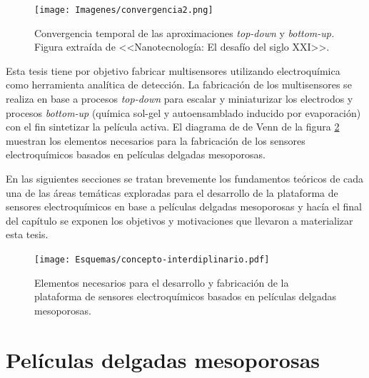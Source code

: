 			\begin{figure}[ht!]
 				\begin{center}
 				\texttt{[image: Imagenes/convergencia2.png]}
 				\caption[Convergencia \textit{top-down }y \textit{bottom-up.}]{Convergencia temporal de las aproximaciones \textit{top-down }y \textit{bottom-up.} Figura extraída de <<Nanotecnología: El desafío del siglo XXI>>.\cite{nanotecnologia-galo}}
 				\label{fig:galo-convergencia}
 		   	    \end{center}
 		   	    \end{figure}

    	Esta tesis tiene por objetivo fabricar multisensores utilizando electroquímica como herramienta analítica de detección. La fabricación de los multisensores se realiza en base a procesos \textit{top-down} para escalar y miniaturizar los electrodos y procesos \textit{bottom-up} (química sol-gel y autoensamblado inducido por evaporación) con el fin sintetizar la película activa. El diagrama de  de Venn de la figura \ref{fig:sensores} muestran los elementos necesarios para la fabricación de los sensores electroquímicos basados en películas delgadas mesoporosas. 
	 	
 		En las siguientes secciones se tratan brevemente los fundamentos teóricos de cada una de las áreas temáticas exploradas para el desarrollo de la plataforma de sensores electroquímicos en base a películas delgadas mesoporosas y hacía el final del capítulo se exponen los objetivos y motivaciones que llevaron a materializar esta tesis.


	       \begin{figure}[ht!]
 				\begin{center}
 				\texttt{[image: Esquemas/concepto-interdiplinario.pdf]}
 				\caption[Plataforma de sensores. Diagrama de Venn.]{Elementos necesarios para el desarrollo y fabricación de la plataforma de sensores electroquímicos basados en películas delgadas mesoporosas.}
 		   		\label{fig:sensores}
 		    	\end{center}
 		    	\end{figure}

\section{Películas delgadas mesoporosas}\label{sec:mesoporosos}
	
